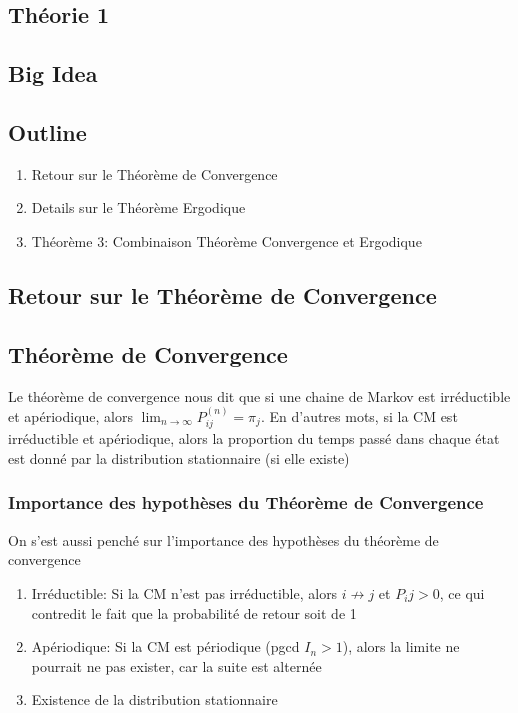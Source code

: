 \documentclass{article}
\begin{document}
\subsection{Théorie 1}
\subsection*{Big Idea}
\subsection*{Outline}
\begin{enumerate}
    \item Retour sur le Théorème de Convergence
    \item Details sur le Théorème Ergodique
    \item Théorème 3: Combinaison Théorème Convergence et Ergodique
\end{enumerate}

\subsection{Retour sur le Théorème de Convergence}

\subsection{Théorème de Convergence}%
\label{sub:Théorème de Convergence}

Le théorème de convergence nous dit que si une chaine de Markov est
irréductible et apériodique, alors $\lim_{n \to \infty} P_{ij} ^{(n)} =
\pi _j$. En d'autres mots, si la CM est irréductible et apériodique,
alors la proportion du temps passé dans chaque état est donné par la
distribution stationnaire (si elle existe)

\subsubsection{Importance des hypothèses du Théorème de Convergence}%
\label{ssub:Importance des hypothèses du Théorème de Convergence}

On s'est aussi penché sur l'importance des hypothèses du théorème de
convergence
\begin{enumerate}
    \item Irréductible: Si la CM n'est pas irréductible, alors $i \not\to j$
	et $P_ij >0$, ce qui contredit le fait que la probabilité de
	retour soit de 1
    \item Apériodique: Si la CM est périodique (pgcd $I_n>1$), alors
	la limite ne pourrait ne pas exister, car la suite est alternée
    \item Existence de la distribution stationnaire
\end{enumerate}
\end{document}
